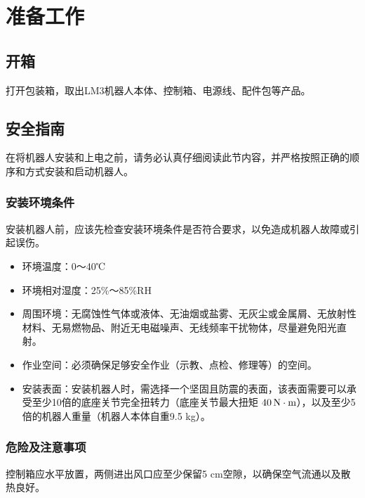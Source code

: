 \chapter{准备工作}
\section{开箱}
打开包装箱，取出LM3机器人本体、控制箱、电源线、配件包等产品。
\section{安全指南}
在将机器人安装和上电之前，请务必认真仔细阅读此节内容，并严格按照正确的顺序和方式安装和启动机器人。

\subsection{安装环境条件}
安装机器人前，应该先检查安装环境条件是否符合要求，以免造成机器人故障或引起误伤。

\begin{itemize}
    \item 环境温度：0～40℃
    \item 环境相对湿度：25\%～85\%RH
    \item 周围环境：无腐蚀性气体或液体、无油烟或盐雾、无灰尘或金属屑、无放射性材料、无易燃物品、附近无电磁噪声、无线频率干扰物体，尽量避免阳光直射。
    \item 作业空间：必须确保足够安全作业（示教、点检、修理等）的空间。
    \item 安装表面：安装机器人时，需选择一个坚固且防震的表面，该表面需要可以承受至少10倍的底座关节完全扭转力（底座关节最大扭矩 $40\,\mathrm{N\cdot m}$），以及至少5倍的机器人重量（机器人本体自重9.5 kg）。
\end{itemize}

 

\subsection{危险及注意事项}
控制箱应水平放置，两侧进出风口应至少保留5 cm空隙，以确保空气流通以及散热良好。

